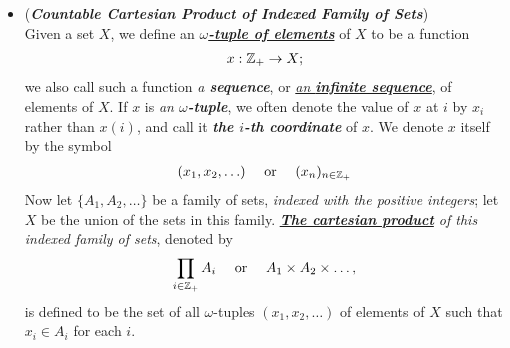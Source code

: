 \documentclass[11pt]{article}
\begin{document}
\begin{itemize}
\item \begin{definition}  (\emph{\textbf{Countable Cartesian Product of Indexed Family of Sets}})\\
Given a set $X$, we define an \underline{\emph{\textbf{$\omega$-tuple of elements}}} of $X$ to be a function
\begin{align*}
x: {\mathbb Z}_{+} \rightarrow X;
\end{align*}
we also call such a function \emph{a \textbf{sequence}}, or \underline{\emph{an \textbf{infinite sequence}}}, of elements of $X$. If
$x$ is \emph{an \textbf{$\omega$-tuple}}, we often denote the value of $x$ at $i$ by $x_i$ rather than $x(i)$, and call it \emph{\textbf{the $i$-th coordinate}} of $x$. We denote $x$ itself by the symbol
\begin{align*}
(x_1, x_2, \ldots ) \quad \text{ or } \quad (x_n)_{n \in {\mathbb Z}_{+}}
\end{align*}
Now let $\{A_1, A_2, \ldots \}$  be a family of sets, \emph{indexed with the positive integers}; let $X$ be the union of the sets in this family. \emph{\textbf{\underline{The cartesian product}} of this indexed family of sets}, denoted by
\begin{align*}
\prod_{i \in {\mathbb Z}_{+}} A_i \quad \text{ or } \quad A_1 \times A_2 \times \ldots , 
\end{align*}
is defined to be the set of all $\omega$-tuples $(x_1, x_2, \ldots ) $ of elements of $X$ such that $x_i \in A_i$ for each $i$.
\end{definition}
\end{itemize}
\end{document}
